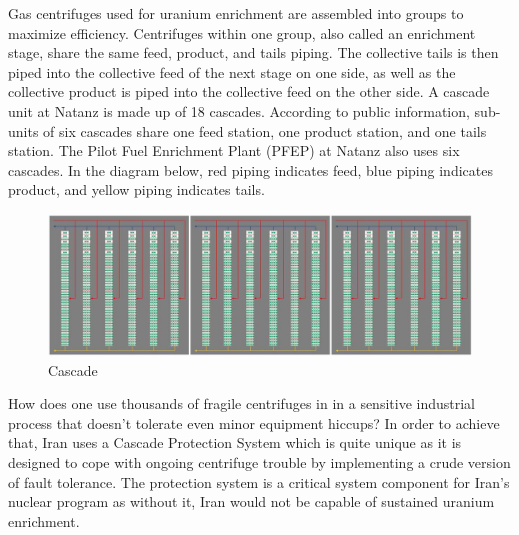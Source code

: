 \documentclass[12pt]{article}
\begin{document}
Gas centrifuges used for uranium enrichment are assembled into groups to maximize efficiency. Centrifuges within one group, also called an enrichment stage, share the same feed, product, and tails piping.
The collective tails is then piped into the collective feed of the next stage on one side, as well as the collective product is piped into the collective feed on the other side.
A cascade unit at Natanz is made up of 18 cascades. According to public information, sub-units of six cascades share one feed station, one product station, and one tails station. The Pilot Fuel Enrichment Plant (PFEP) at Natanz also uses six cascades. In the diagram below, red piping indicates feed, blue piping indicates product, and yellow piping indicates tails.
    \begin{figure}[H]
    \centering
    \includegraphics[height=0.1\textwidth]{cascade.png}
    \caption{Cascade}
    \label{fig:cascade}
    \end{figure}
How does one use thousands of fragile centrifuges in in a sensitive industrial process that doesn't tolerate even minor equipment hiccups? In order to achieve that, Iran uses a Cascade Protection System which is quite unique as it is designed to cope with ongoing centrifuge trouble by implementing a crude version of fault tolerance. The protection system is a critical system component for Iran’s nuclear program as without it, Iran would not be capable of sustained uranium enrichment.
\end{document}
